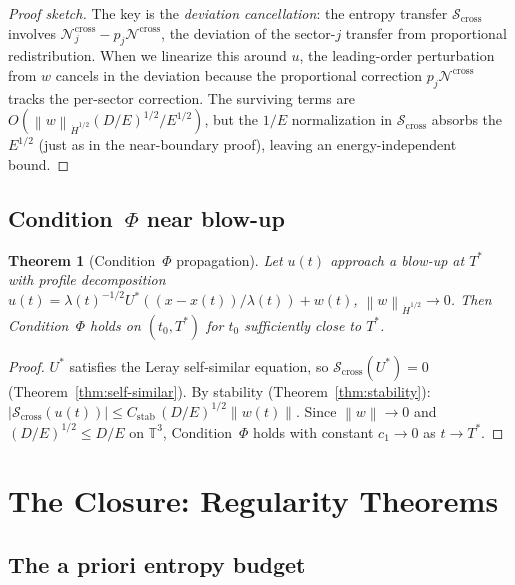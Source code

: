 \documentclass[11pt]{article}
\newtheorem{theorem}{Theorem}[section]
\theoremstyle{definition}
\newcommand{\T}{\mathbb{T}}
\newcommand{\norm}[1]{\left\| #1 \right\|}
\newcommand{\Hdot}[1]{\dot{H}^{#1}}
\newcommand{\cS}{\mathcal{S}}
\newcommand{\cN}{\mathcal{N}}
\begin{document}
\begin{proof}[Proof sketch]
The key is the \emph{deviation cancellation}: the entropy
transfer $\cS_{\mathrm{cross}}$ involves
$\cN_j^{\mathrm{cross}} - p_j\cN^{\mathrm{cross}}$,
the deviation of the sector-$j$ transfer from
proportional redistribution.  When we linearize this
around $u$, the leading-order perturbation from $w$
cancels in the deviation because the proportional
correction $p_j\cN^{\mathrm{cross}}$ tracks the
per-sector correction.  The surviving terms are
$O(\norm{w}_{\Hdot{1/2}}(D/E)^{1/2}/E^{1/2})$,
but the $1/E$ normalization in $\cS_{\mathrm{cross}}$
absorbs the $E^{1/2}$ (just as in the near-boundary
proof), leaving an energy-independent bound.
\end{proof}


\subsection{Condition~$\Phi$ near blow-up}

\begin{theorem}[Condition~$\Phi$ propagation]
\label{thm:propagation}
Let $u(t)$ approach a blow-up at $T^*$ with profile
decomposition $u(t) = \lambda(t)^{-1/2}U^*(
(x-x(t))/\lambda(t)) + w(t)$,
$\norm{w}_{\Hdot{1/2}} \to 0$.
Then Condition~$\Phi$ holds on $(t_0, T^*)$ for
$t_0$ sufficiently close to $T^*$.
\end{theorem}

\begin{proof}
$U^*$ satisfies the Leray self-similar equation, so
$\cS_{\mathrm{cross}}(U^*) = 0$
(Theorem~\ref{thm:self-similar}).
By stability (Theorem~\ref{thm:stability}):
$|\cS_{\mathrm{cross}}(u(t))|
\leq C_{\mathrm{stab}}\,(D/E)^{1/2}\norm{w(t)}$.
Since $\norm{w} \to 0$ and $(D/E)^{1/2} \leq D/E$ on
$\T^3$, Condition~$\Phi$ holds with constant
$c_1 \to 0$ as $t \to T^*$.
\end{proof}


\section{The Closure: Regularity Theorems}
\label{sec:closure}

\subsection{The a priori entropy budget}
\end{document}

